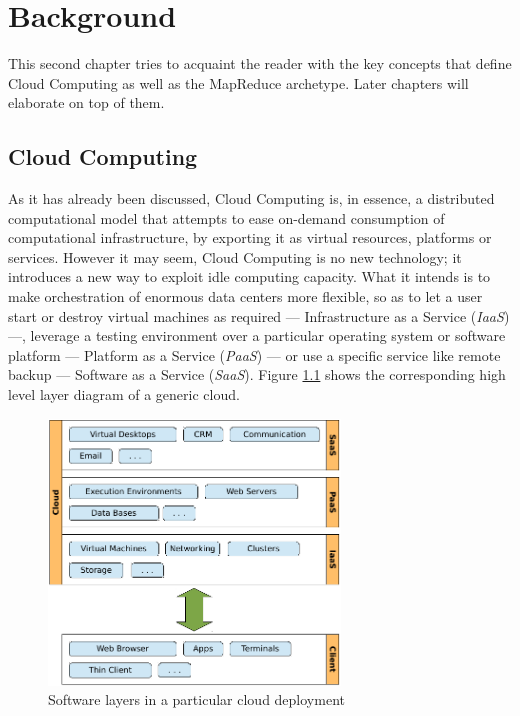 \chapter{Background}\label{cap:estadodelarte}
\noindent This second chapter tries to acquaint the reader with the key concepts that define Cloud Computing as well as the MapReduce archetype. Later chapters will elaborate on top of them.

\section{Cloud Computing}\label{sec:computacioncloud}
\noindent As it has already been discussed, Cloud Computing is, in essence, a distributed computational model that attempts to ease on-demand consumption of computational infrastructure, by exporting it as virtual resources, platforms or services. However it may seem, Cloud Computing is no new technology; it introduces a new way to exploit idle computing capacity. What it intends is to make orchestration of enormous data centers more flexible, so as to let a user start or destroy virtual machines as required --- Infrastructure as a Service (\emph{IaaS}) ---, leverage a testing environment over a particular operating system or software platform --- Platform as a Service (\emph{PaaS}) --- or use a specific service like remote backup --- Software as a Service (\emph{SaaS}). Figure \ref{fig:cloudlayers} shows the corresponding high level layer diagram of a generic cloud.

\begin{figure}[tbp]
\begin{center}
\includegraphics[width=0.69\textwidth]{imagenes/003.pdf}
 \caption{Software layers in a particular cloud deployment}
\label{fig:cloudlayers}
\end{center}
\end{figure}


